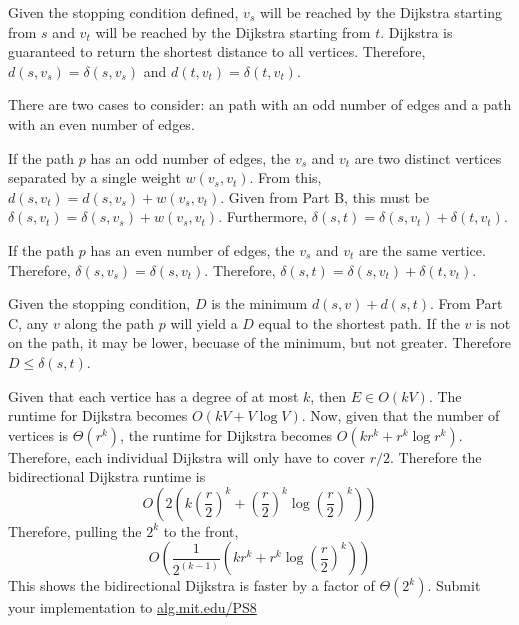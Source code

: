 \documentclass[12pt,twoside]{article}
\begin{document}
\begin{problems}
\begin{problemparts}
\problempart Given the stopping condition defined, $v_s$ will be reached by
the Dijkstra starting from $s$ and $v_t$ will be reached by the Dijkstra
starting from $t$. Dijkstra is guaranteed to return the shortest distance to
all vertices. Therefore, $d(s, v_s) = \delta(s, v_s)$ and $d(t, v_t) =
\delta(t, v_t)$.

\problempart There are two cases to consider: an path with an odd number of
edges and a path with an even number of edges.

If the path $p$ has an odd number of edges, the $v_s$ and $v_t$ are two
distinct vertices separated by a single weight $w(v_s, v_t)$. From this,
$d(s, v_t) = d(s, v_s) + w(v_s, v_t)$. Given from Part B, this must be
$\delta(s, v_t) = \delta(s, v_s) + w(v_s, v_t)$. Furthermore, $\delta(s, t) =
\delta(s, v_t) + \delta(t, v_t)$.

If the path $p$ has an even number of edges, the $v_s$ and $v_t$ are the same
vertice. Therefore, $\delta(s, v_s) = \delta(s, v_t)$. Therefore, $\delta(s,
t) = \delta(s, v_t) + \delta(t, v_t)$.

\problempart Given the stopping condition, $D$ is the minimum $d(s, v) + d(s,
t)$. From Part C, any $v$ along the path $p$ will yield a $D$ equal to the
shortest path. If the $v$ is not on the path, it may be lower, becuase of the
minimum, but not greater. Therefore $D \leq \delta(s, t)$.

\problempart Given that each vertice has a degree of at most $k$, then $E \in
O(kV)$. The runtime for Dijkstra becomes $O(kV + V \log V)$. Now, given that
the number of vertices is $\Theta(r^k)$, the runtime for Dijkstra becomes
$O(k r^k + r^k \log r^k)$. Therefore, each individual Dijkstra will only have
to cover $r / 2$. Therefore the bidirectional Dijkstra runtime is
$$ O\left(2\left(k \left(\frac{r}{2}\right)^k + \left(\frac{r}{2}\right)^k
\log \left(\frac{r}{2}\right)^k \right)\right) $$
Therefore, pulling the $2^k$ to the front,
$$ O\left(\frac{1}{2^{(k - 1)}} \left(k r^k + r^k \log
\left(\frac{r}{2}\right)^k \right)\right) $$
This shows the bidirectional Dijkstra is faster by a factor of $\Theta(2^k)$.
\problempart Submit your implementation to {\small\url{alg.mit.edu/PS8}}
\end{problemparts}

\end{problems}
\end{document}

